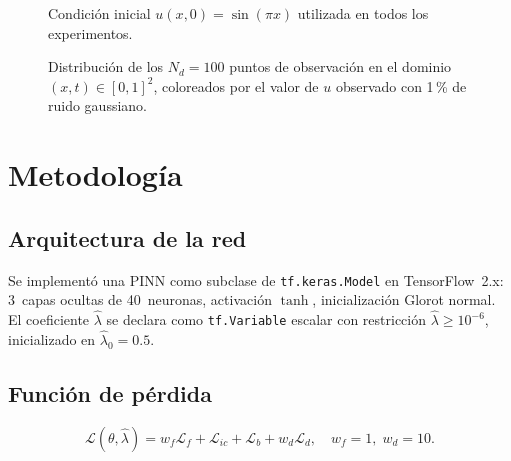 \documentclass[12pt,a4paper]{article}
\newcommand{\lhat}{\hat{\lambda}}
\newcommand{\Lf}{\mathcal{L}_f}
\newcommand{\Lb}{\mathcal{L}_b}
\newcommand{\Li}{\mathcal{L}_{ic}}
\newcommand{\Ld}{\mathcal{L}_d}
\begin{document}
\begin{figure}[H]
  \centering
  \caption{Condición inicial $u(x,0)=\sin(\pi x)$ utilizada en todos los experimentos.}
  \label{fig:ic}
\end{figure}

\begin{figure}[H]
  \centering
  \caption{Distribución de los $N_d=100$ puntos de observación en el dominio
           $(x,t)\in[0,1]^2$, coloreados por el valor de $u$ observado con 1\,\% de ruido gaussiano.}
  \label{fig:datos}
\end{figure}

\section{Metodología}

\subsection{Arquitectura de la red}
Se implementó una PINN como subclase de \texttt{tf.keras.Model} en TensorFlow~2.x:
3~capas ocultas de 40~neuronas, activación $\tanh$, inicialización Glorot normal. El
coeficiente $\lhat$ se declara como \texttt{tf.Variable} escalar con restricción
$\lhat\geq10^{-6}$, inicializado en $\lhat_0=0.5$.

\subsection{Función de pérdida}
\begin{equation}
  \mathcal{L}(\theta,\lhat)=w_f\Lf+\Li+\Lb+w_d\Ld,\quad w_f=1,\;w_d=10.
\end{equation}
\end{document}
